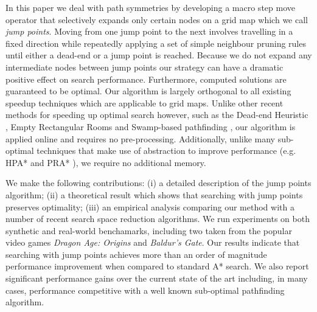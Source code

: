 In this paper we deal with path symmetries by developing a macro step move
operator that selectively expands only certain nodes on a grid map which we call
\emph{jump points}. Moving from one jump point to the next involves travelling
in a fixed direction while repeatedly applying a set of simple neighbour pruning
rules until either a dead-end or a jump point is reached.  Because we do not
expand any intermediate nodes between jump points our strategy can have a
dramatic positive effect on search performance.  Furthermore, computed solutions
are guaranteed to be optimal.  Our algorithm is largely orthogonal to all
existing speedup techniques which are applicable to grid maps.  Unlike other
recent methods for speeding up optimal search however, such as the Dead-end
Heuristic \cite{bjornsson05}, Empty Rectangular Rooms \cite{harabor10} and
Swamp-based pathfinding \cite{pochter10}, our algorithm is applied online and
requires no pre-processing.  Additionally, unlike many sub-optimal techniques
that make use of abstraction to improve performance (e.g. HPA* \cite{botea04}
and PRA* \cite{sturtevant05}), we require no additional memory.

We make the following contributions: (i) a detailed description of the jump
points algorithm; (ii) a theoretical result which shows that searching with jump
points preserves optimality;  (iii) an empirical analysis comparing our method
with a number of recent search space reduction algorithms.  We run experiments
on both synthetic and real-world benchamarks, including two taken from the
popular video games \emph{Dragon Age: Origins} and \emph{Baldur's Gate}.  Our
results indicate that searching with jump points achieves more than an order of
magnitude performance improvement when compared to standard A* search.  We also
report significant performance gains over the current state of the art
including, in many cases, performance competitive with a well known sub-optimal
pathfinding algorithm.
% 
